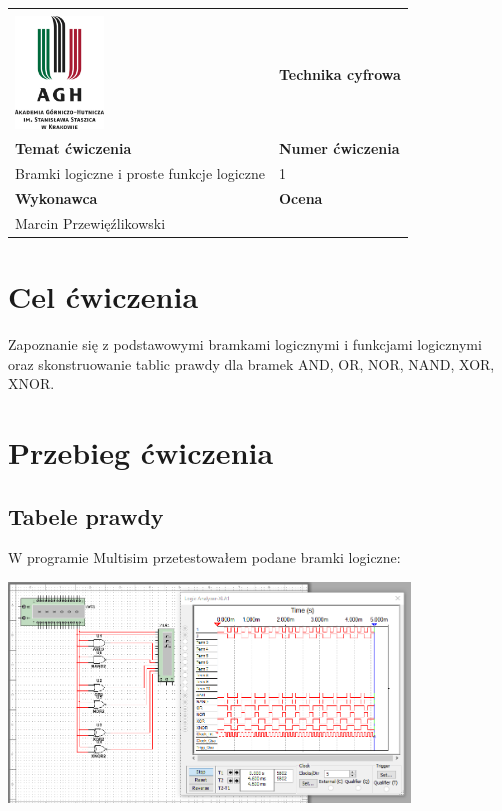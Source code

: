 \documentclass[12pt,a4paper]{article}
\begin{document}
\begin{table}[]
\label{my-label}
\begin{tabular}{|p{7.5cm}|p{7.5cm}|}
\hline
									           					&                           \\
\includegraphics[height=3cm]{logo}             					& \textbf{Technika cyfrowa} \\ \hline
\multicolumn{1}{|l|}{\textbf{Temat ćwiczenia}} 					& \textbf{Numer ćwiczenia}  \\
\multicolumn{1}{|l|}{Bramki logiczne i proste funkcje logiczne}	& 1                         \\ \hline
\multicolumn{1}{|l|}{\textbf{Wykonawca}}       & \textbf{Ocena}            \\
\multicolumn{1}{|l|}{Marcin Przewięźlikowski}          &                           \\ \hline
\end{tabular}
\end{table}

\section{Cel ćwiczenia}

Zapoznanie się z podstawowymi bramkami logicznymi i funkcjami logicznymi oraz skonstruowanie tablic prawdy dla bramek AND, OR, NOR, NAND, XOR, XNOR.



\section{Przebieg ćwiczenia}

\subsection{Tabele prawdy}
W programie Multisim przetestowałem podane bramki logiczne:

\begin{center}
\includegraphics[width=0.8\textwidth]{logic_analyzer/two_way_gates}
\end{center}
\end{document}
